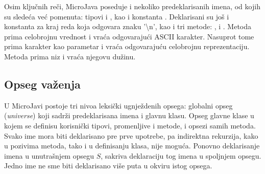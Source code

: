 Osim ključnih reči, MicroJava poseduje i nekoliko predeklarisanih imena, od kojih su sledeća već pomenuta: 
	tipovi  i , kao i konstanta . 
Deklarisani su još i konstanta za kraj reda  koja odgovara znaku '\textbackslash n', 
	kao i tri metode: ,  i . 
Metoda   prima celobrojnu vrednost i vraća odgovarajući ASCII karakter. 
Nasuprot tome  prima karakter kao parametar i vraća odgovarajuću celobrojnu reprezentaciju. 
Metoda  prima niz i vraća njegovu dužinu. 

\subsection*{Opseg važenja}

U MicroJavi postoje tri nivoa leksički ugnježdenih opsega: globalni opseg (\textit{universe}) koji sadrži predeklarisana imena i glavnu klasu. 
Opseg glavne klase u kojem se definisu korisnički tipovi, promenljive i metode, i opsezi samih metoda. 
Svako ime mora biti deklarisano pre prve upotrebe, pa indirektna rekurzija, kako u pozivima metoda, tako i u definisanju klasa, nije moguća. 
Ponovno deklarisanje imena u unutrašnjem opsegu $S$, sakriva deklaraciju tog imena u spoljnjem opsegu. 
Jedno ime ne sme biti deklarisano više puta u okviru istog opsega.
